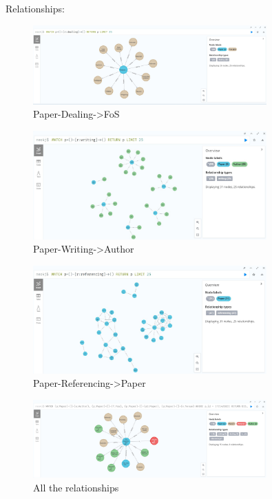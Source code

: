 \documentclass{Configuration_Files/PoliMi3i_thesis}
\begin{document}
Relationships:
    \begin{figure}[H]
    \centering
    \includegraphics[width=0.8\textwidth]{Images/data/Dealing.jpg}
    \caption{Paper-Dealing->FoS}
    \label{fig:quadtree}
\end{figure}
 \begin{figure}[H]
    \centering
    \includegraphics[width=0.8\textwidth]{Images/data/Writing.jpg}
    \caption{Paper-Writing->Author}
    \label{fig:quadtree}
\end{figure}
 \begin{figure}[H]
    \centering
    \includegraphics[width=0.8\textwidth]{Images/data/Referencing.jpg}
    \caption{Paper-Referencing->Paper}
    \label{fig:quadtree}
\end{figure}
\begin{figure}[H]
    \centering
    \includegraphics[width=0.8\textwidth]{Images/data/All_nodes_and_relations.jpg}
    \caption{All the relationships}
    \label{fig:quadtree}
\end{figure}
\end{document}
